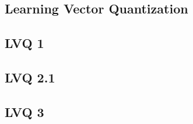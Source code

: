 \subsection{Learning Vector Quantization}\label{sec:lvq}

\subsection{LVQ 1}

\subsection{LVQ 2.1}

\subsection{LVQ 3}
